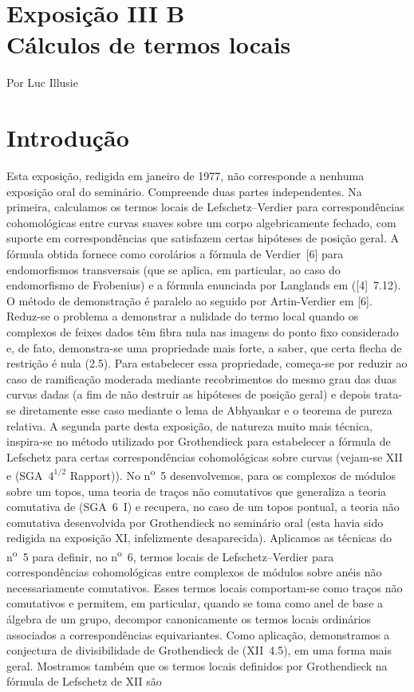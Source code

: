 \section*{Exposição III B\\Cálculos de termos locais}
\begin{center}
Por Luc Illusie
\end{center}

\section*{Introdução}

Esta exposição, redigida em janeiro de 1977, não corresponde a nenhuma exposição oral do seminário. Compreende duas partes independentes. Na primeira, calculamos os termos locais de Lefschetz--Verdier para correspondências cohomológicas entre curvas suaves sobre um corpo algebricamente fechado, com suporte em correspondências que satisfazem certas hipóteses de posição geral. A fórmula obtida fornece como corolários a fórmula de Verdier~[6] para endomorfismos transversais (que se aplica, em particular, ao caso do endomorfismo de Frobenius) e a fórmula enunciada por Langlands em ([4]~7.12). O método de demonstração é paralelo ao seguido por Artin-Verdier em [6]. Reduz-se o problema a demonstrar a nulidade do termo local quando os complexos de feixes dados têm fibra nula nas imagens do ponto fixo considerado e, de fato, demonstra-se uma propriedade mais forte, a saber, que certa flecha de restrição é nula (2.5). Para estabelecer essa propriedade, começa-se por reduzir ao caso de ramificação moderada mediante recobrimentos do mesmo grau das duas curvas dadas (a fim de não destruir as hipóteses de posição geral) e depois trata-se diretamente esse caso mediante o lema de Abhyankar e o teorema de pureza relativa. A segunda parte desta exposição, de natureza muito mais técnica, inspira-se no método utilizado por Grothendieck para estabelecer a fórmula de Lefschetz para certas correspondências cohomológicas sobre curvas (vejam-se XII e (SGA~$4^{1/2}$ Rapport)). No n\textsuperscript{o}~5 desenvolvemos, para os complexos de módulos sobre um topos, uma teoria de traços não comutativos que generaliza a teoria comutativa de (SGA~6~I) e recupera, no caso de um topos pontual, a teoria não comutativa desenvolvida por Grothendieck no seminário oral (esta havia sido redigida na exposição XI, infelizmente desaparecida). Aplicamos as técnicas do n\textsuperscript{o}~5 para definir, no n\textsuperscript{o}~6, termos locais de Lefschetz--Verdier para correspondências cohomológicas entre complexos de módulos sobre anéis não necessariamente comutativos. Esses termos locais comportam-se como traços não comutativos e permitem, em particular, quando se toma como anel de base a álgebra de um grupo, decompor canonicamente os termos locais ordinários associados a correspondências equivariantes. Como aplicação, demonstramos a conjectura de divisibilidade de Grothendieck de (XII~4.5), em uma forma mais geral. Mostramos também que os termos locais definidos por Grothendieck na fórmula de Lefschetz de XII são 